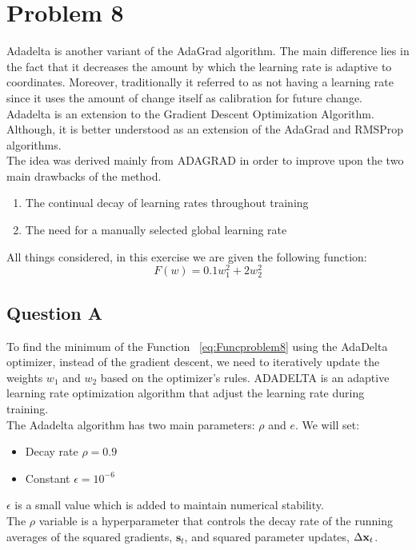 \section{Problem 8}
Adadelta is another variant of the AdaGrad algorithm. The main difference lies in the fact that it decreases the amount by which the learning rate is adaptive to coordinates. Moreover, traditionally it referred to as not having a learning rate since it uses the amount of change itself as calibration for future change. Adadelta is an extension to the Gradient Descent Optimization Algorithm. Although, it is better understood as an extension of the AdaGrad and RMSProp algorithms. \\

The idea was derived mainly from ADAGRAD in order to improve upon the two main drawbacks of the method.
\begin{enumerate}
	\item The continual decay of learning rates throughout training
	\item The need for a manually selected
	global learning rate
\end{enumerate}

All things considered, in this exercise we are given the following function:
\begin{equation}
	F(w) = 0.1w_1^2 + 2w_2^2
\end{equation}
\label{eq:Funcproblem8}
\vspace{1mm}

\subsection{Question A}
To find the minimum of the Function ~\ref{eq:Funcproblem8} using the AdaDelta optimizer, instead of the gradient descent, we need to iteratively update the weights $w_1$ and $w_2$ based on the optimizer's rules. ADADELTA is an adaptive learning rate optimization algorithm that adjust the learning rate during training.\\

The Adadelta algorithm has two main parameters: $\rho$ and $e$. We will set:
\begin{itemize}
	\item Decay rate $\rho = 0.9$
	\item Constant $\epsilon = 10^{-6}$ 
\end{itemize}

$\epsilon$ is a small value which is added to maintain numerical stability.\\
The $\rho$ variable is a hyperparameter that controls the decay rate of the running averages of the squared gradients, $\mathbf{s}_{t}$, and squared parameter updates,	$\Delta{\bf x}_{t}$.\\

